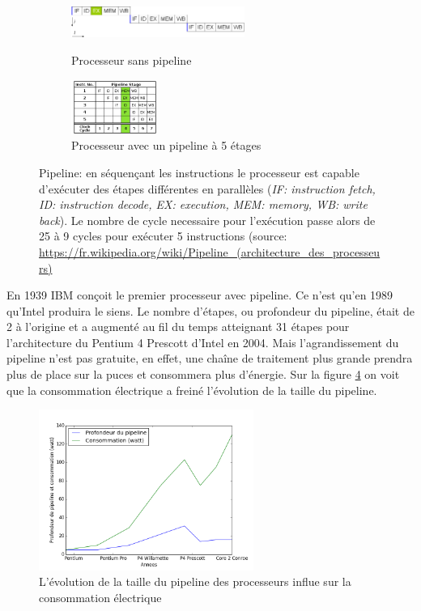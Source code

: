 \begin{figure}[t!]
    \begin{subfigure}[t]{0.5\textwidth}
        \centering
        \includegraphics[height=0.4in]{images/Chapitre1/pipelineNo.png}
        \label{pic_pip_no}
        \caption{Processeur sans pipeline}
    \end{subfigure}%
    \begin{subfigure}[t]{0.5\textwidth}
        \centering
        \includegraphics[height=0.7in]{images/Chapitre1/pipelineYes.png}
        \caption{Processeur avec un pipeline à 5 étages}
        \label{pic_pip_yes}
    \end{subfigure}
    
    \caption{Pipeline: en séquençant les instructions le processeur est capable d'exécuter des étapes différentes en parallèles (\textit{IF: instruction fetch, ID: instruction decode, EX: execution, MEM: memory, WB: write back}). Le nombre de cycle necessaire pour l'exécution passe alors de 25 à 9 cycles pour exécuter 5 instructions (source: \url{https://fr.wikipedia.org/wiki/Pipeline_(architecture_des_processeurs)} }
    \label{pic_pipeline}
\end{figure}





En 1939 IBM conçoit le premier processeur avec pipeline. Ce n'est qu'en 1989 qu'Intel produira le siens. Le nombre d'étapes, ou profondeur du pipeline, était de 2 à l'origine et a augmenté au fil du temps atteignant 31 étapes pour l'architecture du Pentium 4 Prescott d'Intel en 2004. Mais l'agrandissement du pipeline n'est pas gratuite, en effet, une chaîne de traitement plus grande prendra plus de place sur la puces et consommera plus d'énergie. Sur la figure \ref{pic_pipeline_evo} on voit que la consommation électrique a freiné l'évolution de la taille du pipeline.


 \begin{figure}
    \center
    \includegraphics[width=7cm]{images/Chapitre1/pipeline_evo.png}
    \caption{\label{pic_pipeline_evo} L'évolution de la taille du pipeline des processeurs influe sur la consommation électrique}
\end{figure}

